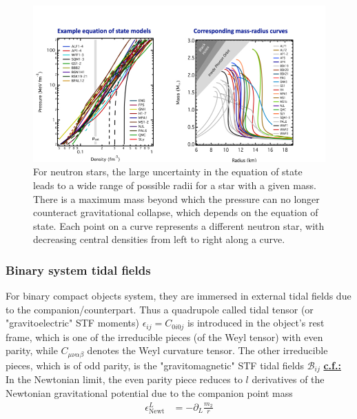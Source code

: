 \documentclass[a4paper, 12pt]{article}
\begin{document}
          \begin{figure}[h!]
          \begin{center}
            \includegraphics[scale=0.4]{Figures/interiorneutron.jpeg}
          \end{center}
          \caption{For neutron stars, the large uncertainty in the
            equation of state leads to a wide range of possible
            radii for a star with a given mass. There is a
            maximum mass beyond which the pressure can no longer
            counteract gravitational collapse, which depends on
            the equation of state. Each point on a curve
            represents a different neutron star, with decreasing
            central densities from left to right along a curve.}
          \label{fig:interiorneutron}
          \end{figure}
         \subsubsection{Binary system tidal fields}%
          \label{sub:Binary system tidal fields}
          For binary compact objects system, they are immersed in
          external tidal fields due to the companion/counterpart.
          Thus a quadrupole called tidal tensor (or
          "gravitoelectric"  STF moments) \( \epsilon_{ij} = C_{0i0j} \) is
          introduced in the object's rest frame, which is one of
          the irreducible pieces (of the Weyl tensor) with even parity, while \( C_{\mu \nu
          \alpha \beta} \) denotes the Weyl curvature tensor. The
          other irreducible pieces, which is of odd parity, is the
          "gravitomagnetic" STF tidal fields \( \mathcal{B}_{ij} \)
      \textbf{\underline{c.f.:}} In the Newtonian limit, the even
      parity piece reduces to \( l \) derivatives of the Newtonian
      gravitational potential due to the companion point mass 
      \begin{align}
        \label{newtonian tidal field}
       \epsilon_{\mathrm{Newt}}^L &= - \partial_{L}^{}
        \frac{m_2}{r}
      \end{align}
\end{document}
